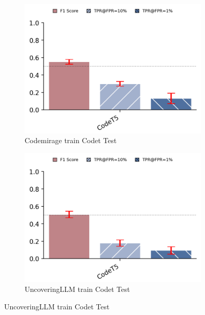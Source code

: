 \begin{figure}[H]
    \begin{subfigure}[b]{0.4\textwidth}
        \centering
        \includegraphics[width=\linewidth]{img/codemiragetrain1.png}
        \caption{Codemirage train Codet Test}
        \label{fig:ffesfe6}
    \end{subfigure}
    \hfill
    \begin{subfigure}[t]{0.4\textwidth}
        \centering
        \includegraphics[width=\linewidth]{img/uncoveringTrain.png}
        \caption{UncoveringLLM train Codet Test}
        \label{fig:bfseds6}
    \end{subfigure}
\end{figure}



